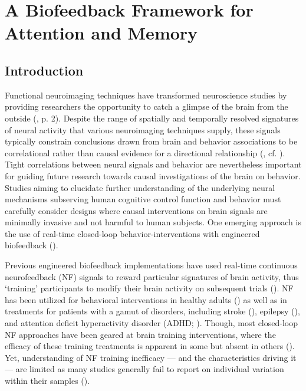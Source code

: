 \chapter{A Biofeedback Framework for Attention and Memory}

\section{Introduction}
Functional neuroimaging techniques have transformed neuroscience studies by providing researchers the opportunity to catch a glimpse of the brain from the outside (\cite{poldrack2018new}, p. 2). Despite the range of spatially and temporally resolved signatures of neural activity that various neuroimaging techniques supply, these signals typically constrain conclusions drawn from brain and behavior associations to be correlational rather than causal evidence for a directional relationship (\cite{atkinson2005visual}, cf. \cite{weber2010functional}). Tight correlations between neural signals and behavior are nevertheless important for guiding future research towards causal investigations of the brain on behavior. Studies aiming to elucidate further understanding of the underlying neural mechanisms subserving human cognitive control function and behavior must carefully consider designs where causal interventions on brain signals are minimally invasive and not harmful to human subjects. One emerging approach is the use of real-time closed-loop behavior-interventions with engineered biofeedback (\cite{laconte2011decoding, alkoby2018can}).

Previous engineered biofeedback implementations have used real-time continuous neurofeedback (NF) signals to reward particular signatures of brain activity, thus `training' participants to modify their brain activity on subsequent trials (\cite{alkoby2018can}). NF has been utilized for behavioral interventions in healthy adults (\cite{hoedlmoser2008instrumental, zoefel2011neurofeedback, wang2013neurofeedback, gruzelier2014eegA, gruzelier2014eegB}) as well as in treatments for patients with a gamut of disorders, including stroke (\cite{rayegani2014effect, doppelmayr2007attempt}), epilepsy (\cite{kotchoubey2001modification, walker2005neurofeedback, sterman2006foundation, tan2009meta, strehl2014sustained}), and attention deficit hyperactivity disorder (ADHD; \cite{thompson2005neurofeedback, leins2007neurofeedback, arns2009efficacy, sonuga2013nonpharmacological}). Though, most closed-loop NF approaches have been geared at brain training interventions, where the efficacy of these training treatments is apparent in some but absent in others (\cite{alkoby2018can, weber2011predicting}). Yet, understanding of NF training inefficacy --- and the characteristics driving it --- are limited as many studies generally fail to report on individual variation within their samples (\cite{alkoby2018can}).

